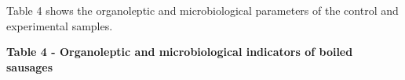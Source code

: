 
Table 4 shows the organoleptic and microbiological parameters of the
control and experimental samples.

{\bfseries Table 4 - Organoleptic and microbiological indicators of boiled
sausages}

